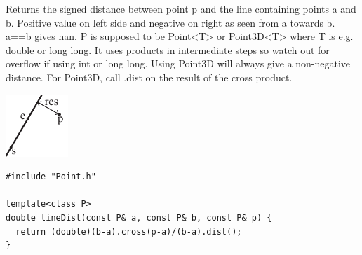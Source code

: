 \begin{minipage}{75mm}
Returns the signed distance between point p and the line containing points a and b. Positive value on left side and negative on right as seen from a towards b. a==b gives nan. P is supposed to be Point<T> or Point3D<T> where T is e.g. double or long long. It uses products in intermediate steps so watch out for overflow if using int or long long. Using Point3D will always give a non-negative distance. For Point3D, call .dist on the result of the cross product.
\end{minipage}
\begin{minipage}{15mm}
\includegraphics[width=\textwidth]{"../code/Geometry/2D Primitive/lineDistance"}
\end{minipage}
\begin{verbatim}
#include "Point.h"

template<class P>
double lineDist(const P& a, const P& b, const P& p) {
  return (double)(b-a).cross(p-a)/(b-a).dist();
}
\end{verbatim}
